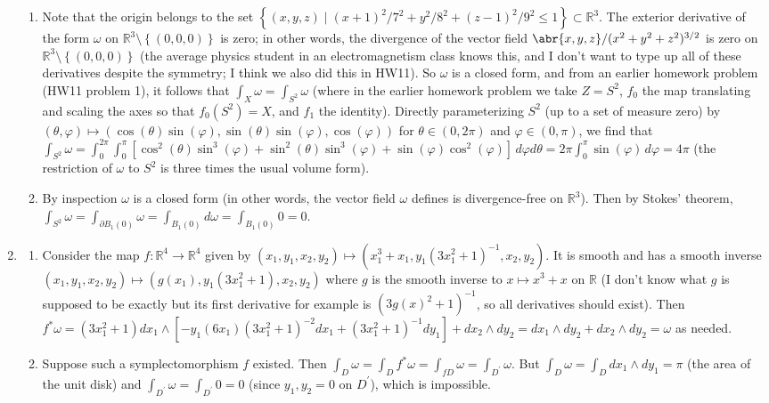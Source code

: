 \documentclass[11pt,leqno]{article}
\theoremstyle{plain}
\theoremstyle{definition}
\numberwithin{equation}{section}
\numberwithin{lem}{section}
\newcommand{\cbr}[1]{\left\{#1\right\}}
\begin{document}
\begin{enumerate}
\begin{enumerate}
        \item Note that the origin belongs to the set $\cbr{(x,y,z)\mid (x+1)^2/7^2 + y^2/8^2 + (z-1)^2/9^2 \leq 1}\subset \mathbb R^3$. The exterior derivative of the form $\omega$ on $\mathbb R^3\setminus \cbr{(0,0,0)}$ is zero; in other words, the divergence of the vector field $\abr{x,y,z}/(x^2+y^2+z^2)^{3/2}$ is zero on $\mathbb R^3\setminus \cbr{(0,0,0)}$ (the average physics student in an electromagnetism class knows this, and I don't want to type up all of these derivatives despite the symmetry; I think we also did this in HW11). So $\omega$ is a closed form, and from an earlier homework problem (HW11 problem 1), it follows that $\int_X\omega = \int_{S^2}\omega$ (where in the earlier homework problem we take $Z = S^2$, $f_0$ the map translating and scaling the axes so that $f_0(S^2) = X$, and $f_1$ the identity). Directly parameterizing $S^2$ (up to a set of measure zero) by $(\theta,\varphi)\mapsto (\cos(\theta)\sin(\varphi),\sin(\theta)\sin(\varphi),\cos(\varphi))$ for $\theta\in (0,2\pi)$ and $\varphi\in (0,\pi)$, we find that $\int_{S^2}\omega = \int_0^{2\pi}\int_0^\pi [\cos^2(\theta)\sin^3(\varphi) + \sin^2(\theta)\sin^3(\varphi) + \sin(\varphi)\cos^2(\varphi)] \,d\varphi d\theta = 2\pi\int_0^\pi\sin(\varphi)\,d\varphi = 4\pi$ (the restriction of $\omega$ to $S^2$ is three times the usual volume form).
        \item By inspection $\omega$ is a closed form (in other words, the vector field $\omega$ defines is divergence-free on $\mathbb R^3$). Then by Stokes' theorem, $\int_{S^2}\omega = \int_{\partial B_1(0)}\omega = \int_{B_1(0)}d\omega = \int_{B_1(0)}0 = 0$.
    \end{enumerate}
    \item \begin{enumerate}
        \item Consider the map $f\colon \mathbb R^4\to \mathbb R^4$ given by $(x_1,y_1,x_2,y_2)\mapsto (x_1^3+x_1,y_1(3x_1^2+1)^{-1}, x_2,y_2)$. It is smooth and has a smooth inverse $(x_1,y_1,x_2,y_2)\mapsto (g(x_1),y_1(3x_1^2+1), x_2,y_2)$ where $g$ is the smooth inverse to $x\mapsto x^3+x$ on $\mathbb R$ (I don't know what $g$ is supposed to be exactly but its first derivative for example is $(3g(x)^2+1)^{-1}$, so all derivatives should exist). Then $f^\ast\omega = (3x_1^2+1)dx_1\wedge [-y_1(6x_1)(3x_1^2+1)^{-2}dx_1 + (3x_1^2+1)^{-1}dy_1] + dx_2\wedge dy_2 = dx_1\wedge dy_2 + dx_2\wedge dy_2 = \omega$ as needed.
        \item Suppose such a symplectomorphism $f$ existed. Then $\int_D \omega = \int_D f^\ast \omega = \int_{fD}\omega = \int_{D^\prime}\omega$. But $\int_D \omega = \int_D dx_1\wedge dy_1 = \pi$ (the area of the unit disk) and $\int_{D^\prime}\omega = \int_{D^\prime} 0 = 0$ (since $y_1,y_2 = 0$ on $D^\prime$), which is impossible.

\end{enumerate}
\end{enumerate}
\end{document}
